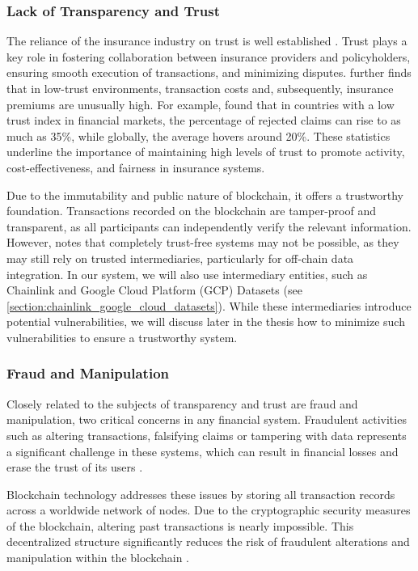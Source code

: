 \subsubsection{Lack of Transparency and Trust}
 
The reliance of the insurance industry on trust is well established \textcite{courbage2021trust}. Trust plays a key role in fostering collaboration between insurance providers and policyholders, ensuring smooth execution of transactions, and minimizing disputes. \textcite{guiso2012trust} further finds that in low-trust environments, transaction costs and, subsequently, insurance premiums are unusually high. For example, \textcite{gennaioli2022trust} found that in countries with a low trust index in financial markets, the percentage of rejected claims can rise to as much as 35\%, while globally, the average hovers around 20\%. These statistics underline the importance of maintaining high levels of trust to promote activity, cost-effectiveness, and fairness in insurance systems.

Due to the immutability and public nature of blockchain, it offers a trustworthy foundation. Transactions recorded on the blockchain are tamper-proof and transparent, as all participants can independently verify the relevant information. However, \textcite{hawlitschek2018limits} notes that completely trust-free systems may not be possible, as they may still rely on trusted intermediaries, particularly for off-chain data integration. In our system, we will also use intermediary entities, such as Chainlink and Google Cloud Platform (GCP) Datasets (see \cref{section:chainlink_google_cloud_datasets}). While these intermediaries introduce potential vulnerabilities, we will discuss later in the thesis how to minimize such vulnerabilities to ensure a trustworthy system.
 
\subsubsection{Fraud and Manipulation}
 
Closely related to the subjects of transparency and trust are fraud and manipulation, two critical concerns in any financial system. Fraudulent activities such as altering transactions, falsifying claims or tampering with data represents a significant challenge in these systems, which can result in financial losses and erase the trust of its users \autocite{Ahmad2024Fraud}.

Blockchain technology addresses these issues by storing all transaction records across a worldwide network of nodes. Due to the cryptographic security measures of the blockchain, altering past transactions is nearly impossible. This decentralized structure significantly reduces the risk of fraudulent alterations and manipulation within the blockchain \autocite{eigelshoven2021cryptocurrency}.

